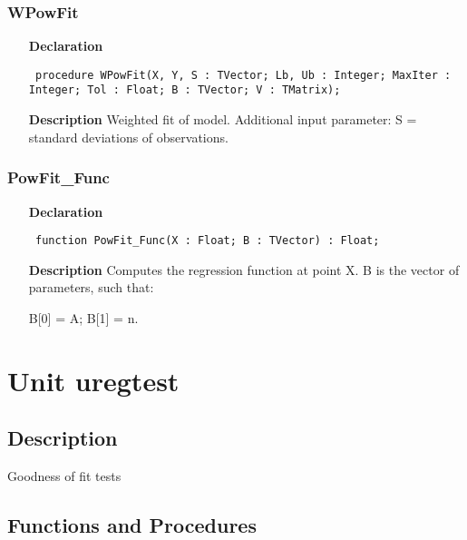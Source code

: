 \documentclass[12pt,a4paper,oneside]{report}
\newcommand{\declarationitem}[1]{\textbf{#1}}
\newcommand{\descriptiontitle}[1]{\textbf{#1}}
\newcommand{\code}[1]{\texttt{#1}}
\begin{document}
\subsubsection{WPowFit}
\label{upowfit-WPowFit}
\begin{itemize}\item[\declarationitem{Declaration}\hfill]
	\begin{flushleft}
		\code{
			procedure WPowFit(X, Y, S : TVector; Lb, Ub : Integer; MaxIter : Integer; Tol : Float; B : TVector; V : TMatrix);}
		
	\end{flushleft}
	
	\par
	\item[\descriptiontitle{Description}]
	Weighted fit of model. Additional input parameter: S = standard deviations of observations.
	
\end{itemize}
\subsubsection{PowFit{\_}Func}
\label{upowfit-PowFit_Func}
\begin{itemize}\item[\declarationitem{Declaration}\hfill]
	\begin{flushleft}
		\code{
			function PowFit{\_}Func(X : Float; B : TVector) : Float;}
		
	\end{flushleft}
	
	\par
	\item[\descriptiontitle{Description}]
	Computes the regression function at point X. B is the vector of parameters, such that:
	
	B[0] = A; B[1] = n.
	
\end{itemize}
\section{Unit uregtest}
\label{uregtest}
\subsection{Description}
Goodness of fit tests
\subsection{Functions and Procedures}
\end{document}
